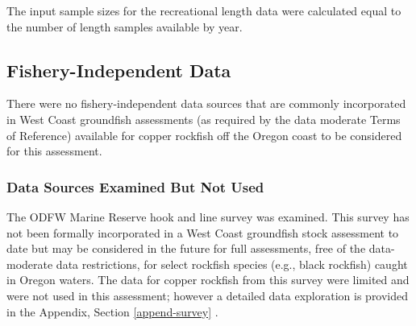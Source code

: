 \documentclass[11pt,
  english,
  a4paper,
]{article}
\begin{document}
\leavevmode\tagmcend\tagstructend\par


The input sample sizes for the recreational length data were calculated equal to the number of length samples available by year.

\leavevmode\tagmcend\tagstructend\par


\hypertarget{fishery-independent-data}{%
\subsection{Fishery-Independent Data}\label{fishery-independent-data}}

\leavevmode\tagmcend\tagstructend


There were no fishery-independent data sources that are commonly incorporated in West Coast groundfish assessments (as required by the data moderate Terms of Reference) available for copper rockfish off the Oregon coast to be considered for this assessment.

\leavevmode\tagmcend\tagstructend\par


\hypertarget{data-sources-examined-but-not-used}{%
\subsubsection{Data Sources Examined But Not Used}\label{data-sources-examined-but-not-used}}

\leavevmode\tagmcend\tagstructend


The ODFW Marine Reserve hook and line survey was examined. This survey has not been formally incorporated in a West Coast groundfish stock assessment to date but may be considered in the future for full assessments, free of the data-moderate data restrictions, for select rockfish species (e.g., black rockfish) caught in Oregon waters. The data for copper rockfish from this survey were limited and were not used in this assessment; however a detailed data exploration is provided in the Appendix, Section \ref{append-survey} .
\end{document}
